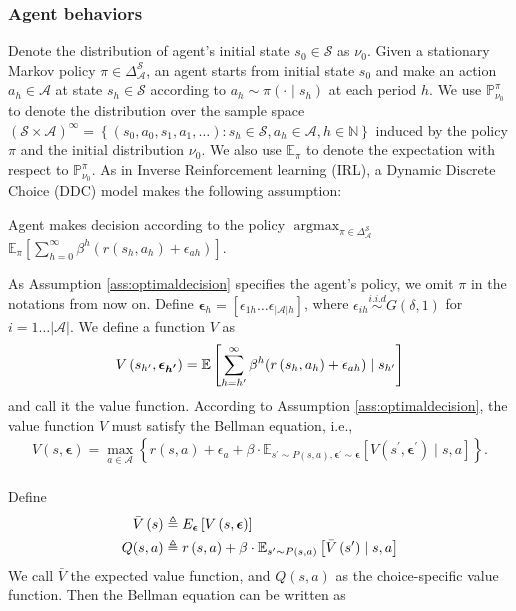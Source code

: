 \subsubsection{Agent behaviors} Denote the distribution of agent's initial state $s_0\in \mathcal{S}$ as $\nu_0$. Given a stationary Markov policy $\pi \in \Delta_{\mathcal{A}}^{\mathcal{S}}$, an agent starts from initial state $s_0$ and make an action $a_h\in \mathcal{A}$ at state $s_h\in \mathcal{S}$ according to $a_h\sim\pi\left(\cdot \mid s_h\right)$ at each period $h$. We use $\mathbb{P}_{\nu_0}^\pi$ to denote the distribution over the sample space $(\mathcal{S} \times \mathcal{A})^{\infty}=\left\{\left(s_0, a_0, s_1, a_1, \ldots\right): s_h \in \mathcal{S}, a_h \in \mathcal{A}, h \in \mathbb{N}\right\}$ induced by the policy $\pi$ and the initial distribution $\nu_0$. We also use $\mathbb{E}_\pi$ to denote the expectation with respect to $\mathbb{P}_{\nu_0}^\pi$. As in Inverse Reinforcement learning (IRL), a Dynamic Discrete Choice (DDC) model makes the following assumption: 

\begin{asmp}\label{ass:optimaldecision} Agent makes decision according to the policy $\operatorname{argmax}_{\pi \in \Delta_{\mathcal{A}}^{\mathcal{S}}}$
$\mathbb{E}_\pi\left[\sum_{h=0}^{\infty} \beta^h( r\left(s_h, a_h\right)+\epsilon_{ah})\right]$.
\end{asmp}

As Assumption \ref{ass:optimaldecision} specifies the agent's policy, we omit $\pi$ in the notations from now on. Define $\boldsymbol{\epsilon}_h = [\epsilon_{1h}\ldots \epsilon_{|\mathcal{A}|h}]$, where $\epsilon_{ih}\overset{i.i.d}{\sim} G(\delta, 1)$ for $i=1\ldots |\mathcal{A}|$. We define a function $V$ as
\begin{align}
    V\left(s_{h^\prime}, \boldsymbol{\epsilon_{h^\prime}}\right) = \mathbb{E}\left[\sum_{h=h^\prime}^{\infty} \beta^h( r\left(s_h, a_h\right)+\epsilon_{ah})\mid s_{h^\prime}\right] \notag
\end{align}
and call it the value function. According to Assumption \ref{ass:optimaldecision}, the value function $V$ must satisfy the Bellman equation, i.e., 
\begin{align}
V\left(s, \boldsymbol{\epsilon}\right)=\max _{a \in \mathcal{A}}\left\{r\left(s, a\right)+\epsilon_{a}+\beta \cdot \mathbb{E}_{s^\prime \sim P(s, a), \boldsymbol{\epsilon^\prime }\sim \boldsymbol{\epsilon}}\left[V\left(s^\prime, \boldsymbol{\epsilon}^\prime\right)\mid s, a\right]\right\} \label{eq:VBellman}.
\end{align}
\;
\\
Define 
\begin{align}
    \bar{V}\left(s\right) &\triangleq E_{\boldsymbol{\epsilon}}\left[V\left(s, \boldsymbol{\epsilon}\right)\right] \notag
    \\
    Q(s, a) &\triangleq r\left(s, a\right)+\beta \cdot \mathbb{E}_{s^\prime \sim P(s, a)}\left[\bar{V}\left(s^\prime\right)\mid s, a\right]\label{eq:QandexpV}
\end{align}
We call $\bar{V}$ the expected value function, and $Q(s, a)$ as the choice-specific value function. Then the Bellman equation can be written as

